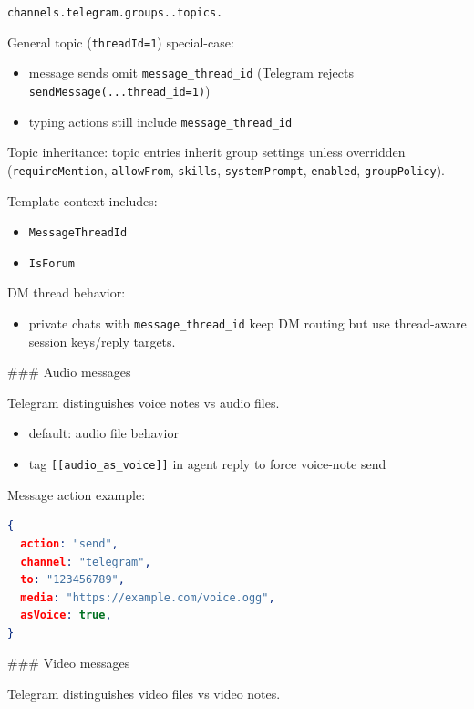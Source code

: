 \texttt{channels.telegram.groups..topics.}

General topic (\texttt{threadId=1}) special-case:

\begin{itemize}
  \item message sends omit \texttt{message\_thread\_id} (Telegram rejects \texttt{sendMessage(...thread\_id=1)})
  \item typing actions still include \texttt{message\_thread\_id}
\end{itemize}


Topic inheritance: topic entries inherit group settings unless overridden (\texttt{requireMention}, \texttt{allowFrom}, \texttt{skills}, \texttt{systemPrompt}, \texttt{enabled}, \texttt{groupPolicy}).

Template context includes:

\begin{itemize}
  \item \texttt{MessageThreadId}
  \item \texttt{IsForum}
\end{itemize}


DM thread behavior:

\begin{itemize}
  \item private chats with \texttt{message\_thread\_id} keep DM routing but use thread-aware session keys/reply targets.
\end{itemize}



\#\#\# Audio messages

Telegram distinguishes voice notes vs audio files.

\begin{itemize}
  \item default: audio file behavior
  \item tag \texttt{[[audio\_as\_voice]]} in agent reply to force voice-note send
\end{itemize}


Message action example:

\begin{lstlisting}[language=json]
{
  action: "send",
  channel: "telegram",
  to: "123456789",
  media: "https://example.com/voice.ogg",
  asVoice: true,
}
\end{lstlisting}


\#\#\# Video messages

Telegram distinguishes video files vs video notes.

